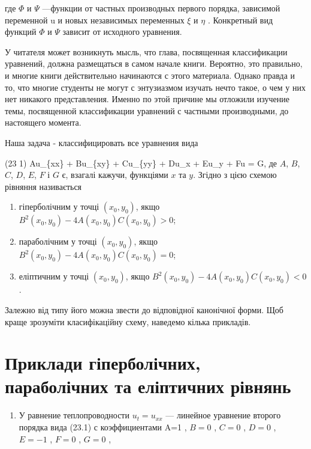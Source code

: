 \documentclass[
  ukrainian,
]{article}
\providecommand{\tightlist}{%
  \setlength{\itemsep}{0pt}\setlength{\parskip}{0pt}}
\begin{document}
где \(\Phi\) и \(\Psi\) ---функции от частных производных первого
порядка, зависимой переменной u и новых независимых переменных \(\xi\) и
\(\eta\) . Конкретный вид функций \(\Phi\) и \(\Psi\) зависит от
исходного уравнения.

У читателя может возникнуть мысль, что глава, посвященная классификации
уравнений, должна размещаться в самом начале книги. Вероятно, это
правильно, и многие книги действительно начинаются с этого материала.
Однако правда и то, что многие студенты не могут с энтузиазмом изучать
нечто такое, о чем у них нет никакого представления. Именно по этой
причине мы отложили изучение темы, посвященной классификации уравнений с
частными производными, до настоящего момента.

Наша задача - классифицировать все уравнения вида

(23 1) Au\_\{xx\} + Bu\_\{xy\} + Cu\_\{yy\} + Du\_x + Eu\_y + Fu = G, де
\(A\), \(B\), \(C\), \(D\), \(E\), \(F\) і \(G\) є, взагалі кажучи,
функціями \(x\) та \(y\). Згідно з цією схемою рівняння називається

\begin{enumerate}
\def\labelenumi{\arabic{enumi}.}
\tightlist
\item
  гіперболічним у точці \((x_0, y_0)\), якщо
  \(B^2(x_0, y_0) - 4A(x_0, y_0)C(x_0, y_0) > 0\);
\item
  параболічним у точці \((x_0, y_0)\), якщо
  \(B^2(x_0, y_0) - 4A(x_0, y_0)C(x_0, y_0) = 0\);
\item
  еліптичним у точці \((x_0, y_0)\), якщо
  \(B^2(x_0, y_0) - 4A(x_0, y_0)C(x_0, y_0) < 0\).
\end{enumerate}

Залежно від типу його можна звести до відповідної канонічної форми. Щоб
краще зрозуміти класифікаційну схему, наведемо кілька прикладів.

\section{Приклади гіперболічних, параболічних та еліптичних
рівнянь}\label{ux43fux440ux438ux43aux43bux430ux434ux438-ux433ux456ux43fux435ux440ux431ux43eux43bux456ux447ux43dux438ux445-ux43fux430ux440ux430ux431ux43eux43bux456ux447ux43dux438ux445-ux442ux430-ux435ux43bux456ux43fux442ux438ux447ux43dux438ux445-ux440ux456ux432ux43dux44fux43dux44c}

\begin{enumerate}
\def\labelenumi{\arabic{enumi}.}
\tightlist
\item
  У равнение теплопроводности \(u_t = u_{xx}\) --- линейное уравнение
  второго порядка вида (23.1) с коэффициентами A=1 , \(B=0\) , \(C=0\) ,
  \(D=0\) , \(E=-1\) , \(F=0\) , \(G=0\) ,
\end{enumerate}
\end{document}
